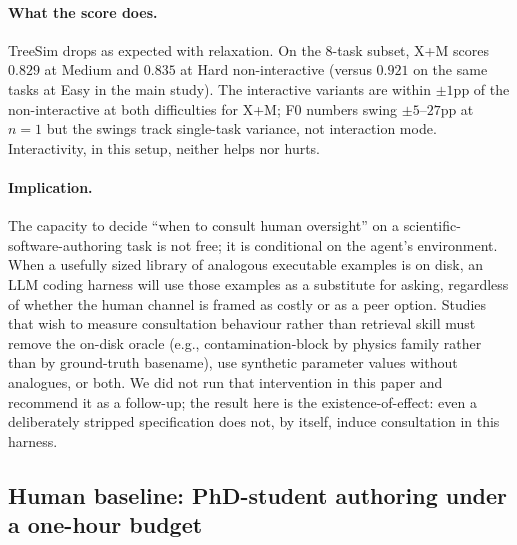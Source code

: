 \documentclass{article}
\begin{document}
\paragraph{What the score does.} TreeSim drops as expected with relaxation. On the 8-task subset, X+M scores $0.829$ at Medium and $0.835$ at Hard non-interactive (versus $0.921$ on the same tasks at Easy in the main study). The interactive variants are within $\pm 1$pp of the non-interactive at both difficulties for X+M; F0 numbers swing $\pm 5$--$27$pp at $n=1$ but the swings track single-task variance, not interaction mode. Interactivity, in this setup, neither helps nor hurts.

\paragraph{Implication.} The capacity to decide ``when to consult human oversight'' on a scientific-software-authoring task is not free; it is conditional on the agent's environment. When a usefully sized library of analogous executable examples is on disk, an LLM coding harness will use those examples as a substitute for asking, regardless of whether the human channel is framed as costly or as a peer option. Studies that wish to measure consultation behaviour rather than retrieval skill must remove the on-disk oracle (e.g., contamination-block by physics family rather than by ground-truth basename), use synthetic parameter values without analogues, or both. We did not run that intervention in this paper and recommend it as a follow-up; the result here is the existence-of-effect: even a deliberately stripped specification does not, by itself, induce consultation in this harness.

\subsection{Human baseline: PhD-student authoring under a one-hour budget}
\label{subsec:human-baseline}
\end{document}

